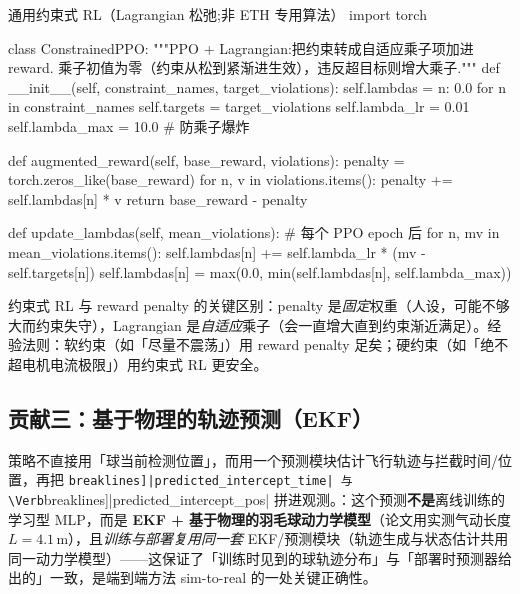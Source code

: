 \begin{codebox}[Python]{通用约束式 RL（Lagrangian 松弛;非 ETH 专用算法）}
import torch

class ConstrainedPPO:
    """PPO + Lagrangian:把约束转成自适应乘子项加进 reward.
    乘子初值为零（约束从松到紧渐进生效），违反超目标则增大乘子."""
    def __init__(self, constraint_names, target_violations):
        self.lambdas = {n: 0.0 for n in constraint_names}
        self.targets = target_violations
        self.lambda_lr = 0.01
        self.lambda_max = 10.0                      # 防乘子爆炸

    def augmented_reward(self, base_reward, violations):
        penalty = torch.zeros_like(base_reward)
        for n, v in violations.items():
            penalty += self.lambdas[n] * v
        return base_reward - penalty

    def update_lambdas(self, mean_violations):       # 每个 PPO epoch 后
        for n, mv in mean_violations.items():
            self.lambdas[n] += self.lambda_lr * (mv - self.targets[n])
            self.lambdas[n] = max(0.0, min(self.lambdas[n], self.lambda_max))
\end{codebox}

约束式 RL 与 reward penalty 的关键区别：penalty 是\emph{固定}权重（人设，可能不够大而约束失守），Lagrangian 是\emph{自适应}乘子（会一直增大直到约束渐近满足）。经验法则：软约束（如「尽量不震荡」）用 reward penalty 足矣；硬约束（如「绝不超电机电流极限」）用约束式 RL 更安全。

\subsection{贡献三：基于物理的轨迹预测（EKF）}
\label{sec:rlmc-lm-eth-pred}

策略不直接用「球当前检测位置」，而用一个预测模块估计飞行轨迹与拦截时间/位置，再把 \Verb[breaklines]|predicted_intercept_time| 与 \Verb[breaklines]|predicted_intercept_pos| 拼进观测。：这个预测\textbf{不是}离线训练的学习型 MLP，而是 \textbf{EKF + 基于物理的羽毛球动力学模型}（论文用实测气动长度 $L=4.1\,$m），且\emph{训练与部署复用同一套} EKF/预测模块（轨迹生成与状态估计共用同一动力学模型）——这保证了「训练时见到的球轨迹分布」与「部署时预测器给出的」一致，是端到端方法 sim-to-real 的一处关键正确性。

